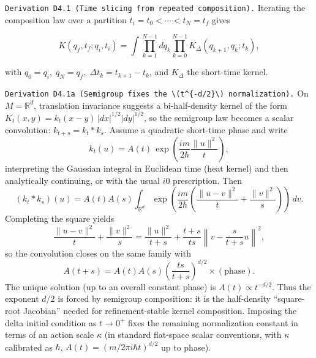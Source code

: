 \documentclass[
]{article}
\begin{document}
\texttt{Derivation\ D4.1\ (Time\ slicing\ from\ repeated\ composition).}
Iterating the composition law over a partition
\(t_i=t_0<\cdots<t_N=t_f\) gives

\[
K(q_f,t_f;q_i,t_i)=
\int \prod_{k=1}^{N-1} dq_k
\prod_{k=0}^{N-1}
K_\Delta(q_{k+1},q_k;t_k),
\]

with \(q_0=q_i,\;q_N=q_f,\;\Delta t_k=t_{k+1}-t_k\), and \(K_\Delta\)
the short-time kernel.

\texttt{Derivation\ D4.1a\ (Semigroup\ fixes\ the\ \textbackslash{}(t\^{}\{-d/2\}\textbackslash{})\ normalization).}
On \(M=\mathbb R^d\), translation invariance suggests a bi-half-density
kernel of the form \(K_t(x,y)=k_t(x-y)\,|dx|^{1/2}|dy|^{1/2}\), so the
semigroup law becomes a scalar convolution: \(k_{t+s}=k_t*k_s\). Assume
a quadratic short-time phase and write \[
k_t(u)=A(t)\,\exp\!\left(\frac{i m}{2\hbar}\frac{\|u\|^2}{t}\right),
\] interpreting the Gaussian integral in Euclidean time (heat kernel)
and then analytically continuing, or with the usual \(i0\) prescription.
Then \[
(k_t*k_s)(u)=A(t)A(s)\int_{\mathbb R^d}
\exp\!\left(\frac{i m}{2\hbar}\left(\frac{\|u-v\|^2}{t}+\frac{\|v\|^2}{s}\right)\right)\,dv.
\] Completing the square yields \[
\frac{\|u-v\|^2}{t}+\frac{\|v\|^2}{s}
=\frac{\|u\|^2}{t+s}+\frac{t+s}{ts}\left\|v-\frac{s}{t+s}u\right\|^2,
\] so the convolution closes on the same family with \[
A(t+s)=A(t)A(s)\left(\frac{ts}{t+s}\right)^{d/2}\times(\text{phase}).
\] The unique solution (up to an overall constant phase) is
\(A(t)\propto t^{-d/2}\). Thus the exponent \(d/2\) is forced by
semigroup composition: it is the half-density ``square-root Jacobian''
needed for refinement-stable kernel composition. Imposing the delta
initial condition as \(t\to0^+\) fixes the remaining normalization
constant in terms of an action scale \(\kappa\) (in standard flat-space
scalar conventions, with \(\kappa\) calibrated as \(\hbar\),
\(A(t)=(m/2\pi i\hbar t)^{d/2}\) up to phase).
\end{document}
